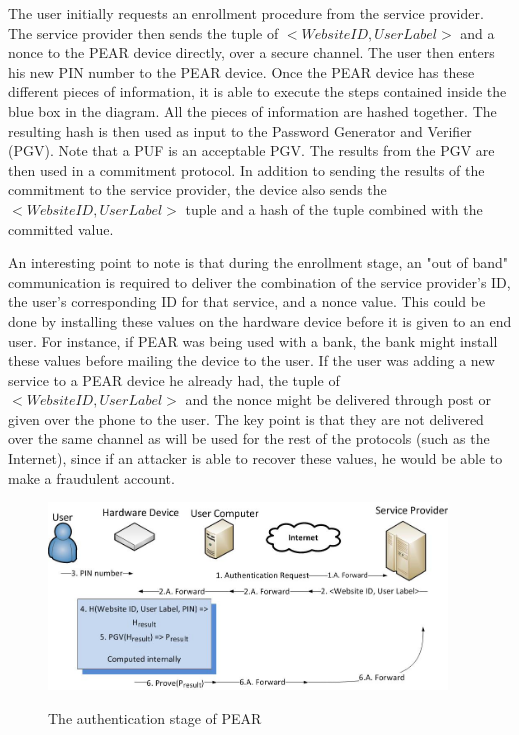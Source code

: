 The user initially requests an enrollment procedure from the service provider. The service provider then sends the tuple
of $<Website ID, User Label>$ and a nonce to the PEAR device directly, over a secure channel. The user then enters his
new PIN number to the PEAR device. Once the PEAR device has these different pieces of information, it is able to execute
the steps contained inside the blue box in the diagram. All the pieces of information are hashed together. The resulting
hash is then used as input to the Password Generator and Verifier (PGV). Note that a PUF is an acceptable PGV. The results
from the PGV are then used in a commitment protocol. In addition to sending the results of the commitment to the service
provider, the device also sends the $<Website ID, User Label>$ tuple and a hash of the tuple combined with the committed value.

An interesting point to note is that during the enrollment stage, an "out of band" communication is required to deliver
the combination of the service provider's ID, the user's corresponding ID for that service, and a nonce value. This could
be done by installing these values on the hardware device before it is given to an end user. For instance, if PEAR was being
used with a bank, the bank might install these values before mailing the device to the user. If the user was adding a new
service to a PEAR device he already had, the tuple of $<Website ID, User Label>$ and the nonce might be delivered through
post or given over the phone to the user. The key point is that they are not delivered over the same channel as will be
used for the rest of the protocols (such as the Internet), since if an attacker is able to recover these values, he would
be able to make a fraudulent account.

\begin{figure}[!ht]
\includegraphics[width=400px]{images/auth.jpg}
\label{fig:pearauthentication}
\caption{The authentication stage of PEAR}
\end{figure}
\FloatBarrier

